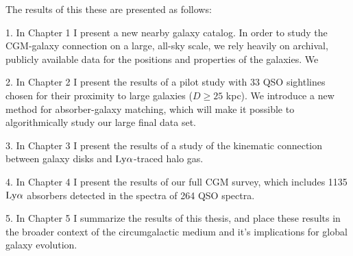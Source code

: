 \documentclass[twocolumn,tighten]{aastex62}
\begin{document}
The results of this these are presented as follows:

1. In Chapter 1 I present a new nearby galaxy catalog. In order to study the CGM-galaxy connection on a large, all-sky scale, we rely heavily on archival, publicly available data for the positions and properties of the galaxies. We 

 
2. In Chapter 2 I present the results of a pilot study with 33 QSO sightlines chosen for their proximity to large galaxies ($D \ge 25$ kpc). We introduce a new method for absorber-galaxy matching, which will make it possible to algorithmically study our large final data set. 

3. In Chapter 3 I present the results of a study of the kinematic connection between galaxy disks and $\rm Ly\alpha$-traced halo gas. 

4. In Chapter 4 I present the results of our full CGM survey, which includes 1135 $\rm Ly\alpha$ absorbers detected in the spectra of 264 QSO spectra.

5. In Chapter 5 I summarize the results of this thesis, and place these results in the broader context of the circumgalactic medium and it's implications for global galaxy evolution.



%
{}


\clearpage

\appendix
\end{document}
